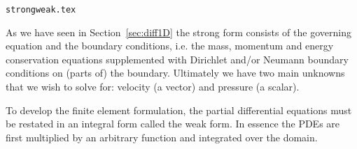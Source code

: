 \begin{flushright} {\tiny {\color{gray} \tt strongweak.tex}} \end{flushright}


As we have seen in Section~\ref{sec:diff1D}
the strong form consists of the governing equation and the boundary conditions, i.e. 
the mass, momentum and energy conservation equations supplemented with Dirichlet and/or Neumann
boundary conditions on (parts of) the boundary. Ultimately we have two main unknowns that 
we wish to solve for: velocity (a vector) and pressure (a scalar).

To develop the finite element formulation, the partial differential equations 
must be restated in an integral form called the weak form. In essence the PDEs are 
first multiplied by an arbitrary function and integrated over the domain.

